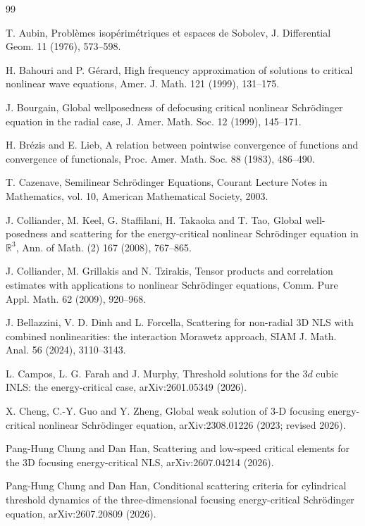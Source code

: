 \documentclass{interact}
\numberwithin{equation}{section}
\theoremstyle{plain}
\theoremstyle{definition}
\theoremstyle{remark}
\newcommand{\R}{\mathbb R}
\begin{document}
\begin{thebibliography}{99}
\small

T. Aubin, Probl\`emes isop\'erim\'etriques et espaces de Sobolev, J. Differential Geom. 11 (1976), 573--598.

H. Bahouri and P. G\'erard, High frequency approximation of solutions to critical nonlinear wave equations, Amer. J. Math. 121 (1999), 131--175.

J. Bourgain, Global wellposedness of defocusing critical nonlinear Schr\"odinger equation in the radial case, J. Amer. Math. Soc. 12 (1999), 145--171.

H. Br\'ezis and E. Lieb, A relation between pointwise convergence of functions and convergence of functionals, Proc. Amer. Math. Soc. 88 (1983), 486--490.

T. Cazenave, Semilinear Schr\"odinger Equations, Courant Lecture Notes in Mathematics, vol. 10, American Mathematical Society, 2003.

J. Colliander, M. Keel, G. Staffilani, H. Takaoka and T. Tao,
Global well-posedness and scattering for the energy-critical nonlinear Schr\"odinger equation in $\R^3$,
Ann. of Math. (2) 167 (2008), 767--865.

J. Colliander, M. Grillakis and N. Tzirakis, Tensor products and correlation estimates with applications to nonlinear Schr\"odinger equations, Comm. Pure Appl. Math. 62 (2009), 920--968.

J. Bellazzini, V. D. Dinh and L. Forcella, Scattering for non-radial 3D NLS with combined nonlinearities: the interaction Morawetz approach, SIAM J. Math. Anal. 56 (2024), 3110--3143.

L. Campos, L. G. Farah and J. Murphy, Threshold solutions for the $3d$ cubic INLS: the energy-critical case, arXiv:2601.05349 (2026).

X. Cheng, C.-Y. Guo and Y. Zheng, Global weak solution of 3-D focusing energy-critical nonlinear Schr\"odinger equation, arXiv:2308.01226 (2023; revised 2026).

Pang-Hung Chung and Dan Han, Scattering and low-speed critical elements for the 3D focusing energy-critical NLS, arXiv:2607.04214 (2026).

Pang-Hung Chung and Dan Han, Conditional scattering criteria for cylindrical threshold dynamics of the three-dimensional focusing energy-critical Schr\"odinger equation, arXiv:2607.20809 (2026).


\end{thebibliography}
\end{document}
